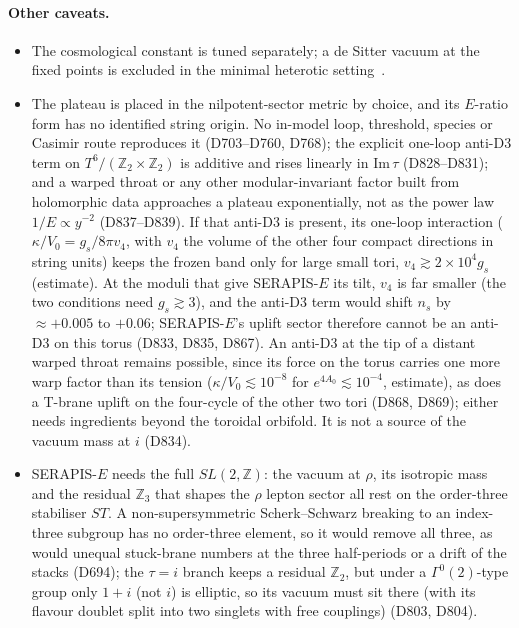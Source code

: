 \documentclass[aps,prd,twocolumn,superscriptaddress,nofootinbib,floatfix]{revtex4-2}
\begin{document}
\paragraph{Other caveats.}
\begin{itemize}
\item The cosmological constant is tuned separately; a de Sitter vacuum at the fixed points is excluded in the minimal heterotic setting~\cite{arXiv_2212_03876}.
\item The plateau is placed in the nilpotent-sector metric by choice, and its $E$-ratio form has no identified string origin. No in-model loop, threshold, species or Casimir route reproduces it (D703--D760, D768); the explicit one-loop anti-D3 term on $T^6/(\mathbb{Z}_2\times\mathbb{Z}_2)$ is additive and rises linearly in $\mathrm{Im}\,\tau$ (D828--D831); and a warped throat or any other modular-invariant factor built from holomorphic data approaches a plateau exponentially, not as the power law $1/E\propto y^{-2}$ (D837--D839). If that anti-D3 is present, its one-loop interaction ($\kappa/V_0=g_s/8\pi v_4$, with $v_4$ the volume of the other four compact directions in string units) keeps the frozen band only for large small tori, $v_4\gtrsim2\times10^4g_s$ (estimate). At the moduli that give SERAPIS-$E$ its tilt, $v_4$ is far smaller (the two conditions need $g_s\gtrsim3$), and the anti-D3 term would shift $n_s$ by $\approx+0.005$ to $+0.06$; SERAPIS-$E$'s uplift sector therefore cannot be an anti-D3 on this torus (D833, D835, D867). An anti-D3 at the tip of a distant warped throat remains possible, since its force on the torus carries one more warp factor than its tension ($\kappa/V_0\lesssim10^{-8}$ for $e^{4A_0}\lesssim10^{-4}$, estimate), as does a T-brane uplift on the four-cycle of the other two tori (D868, D869); either needs ingredients beyond the toroidal orbifold. It is not a source of the vacuum mass at $i$ (D834).
\item SERAPIS-$E$ needs the full $SL(2,\mathbb{Z})$: the vacuum at $\rho$, its isotropic mass and the residual $\mathbb{Z}_3$ that shapes the $\rho$ lepton sector all rest on the order-three stabiliser $ST$. A non-supersymmetric Scherk--Schwarz breaking to an index-three subgroup has no order-three element, so it would remove all three, as would unequal stuck-brane numbers at the three half-periods or a drift of the stacks (D694); the $\tau=i$ branch keeps a residual $\mathbb{Z}_2$, but under a $\Gamma^0(2)$-type group only $1+i$ (not $i$) is elliptic, so its vacuum must sit there (with its flavour doublet split into two singlets with free couplings) (D803, D804).

\end{itemize}
\end{document}
